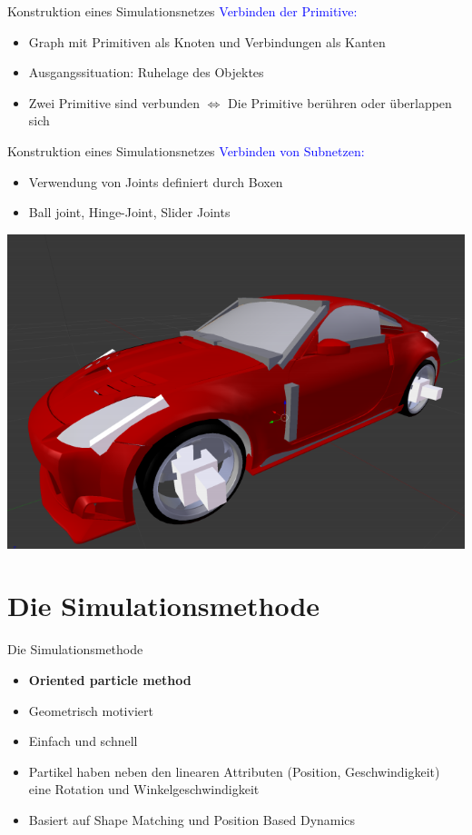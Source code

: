 \documentclass[t]{beamer}
\begin{document}
	\begin{frame}{Konstruktion eines Simulationsnetzes}
		\textcolor{blue}{Verbinden der Primitive:}
		\begin{itemize}
			\item Graph mit Primitiven als Knoten und Verbindungen als Kanten
			\item Ausgangssituation: Ruhelage des Objektes
			\item Zwei Primitive sind verbunden $\Leftrightarrow$ Die Primitive berühren oder überlappen sich
		\end{itemize}
	\end{frame}

	\begin{frame}{Konstruktion eines Simulationsnetzes}
		\textcolor{blue}{Verbinden von Subnetzen:}
		\begin{itemize}
			\item Verwendung von Joints definiert durch Boxen
			\item Ball joint, Hinge-Joint, Slider Joints
		\end{itemize}
		\vfill
		\centering
		\includegraphics[scale = 0.3]{Joints.png}
	\end{frame}
	
	\section{Die Simulationsmethode}
	\begin{frame}{Die Simulationsmethode}
		\begin{itemize}
			\item \textbf{Oriented particle method}
			\item Geometrisch motiviert
			\item Einfach und schnell
			\item Partikel haben neben den linearen Attributen (Position, Geschwindigkeit) eine Rotation und Winkelgeschwindigkeit
			\item Basiert auf Shape Matching und Position Based Dynamics
		\end{itemize}
	\end{frame}	
	
\end{document}
